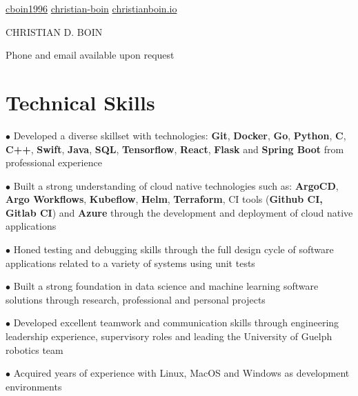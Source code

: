 \documentclass[a4paper,11pt]{article}
\newcommand{\name}{CHRISTIAN D. BOIN} %
\newcommand{\github}{cboin1996} %
\newcommand{\linkedin}{christian-boin-6b705a135} %
\begin{document}
\selectfont


\newcommand{\iconspace}{0.4mm}
\newcommand{\headingsep}{1cm}
\begin{center}
    \small{\href{https://github.com/\github}{\faGithub \hspace{\iconspace} \github} \hspace{\headingsep}
           \href{https://www.linkedin.com/in/\linkedin/}{\faLinkedinSquare \hspace{\iconspace} christian-boin} \hspace{\headingsep}
           \href{http://www.christianboin.io}{\faFileCodeO \hspace{\iconspace} christianboin.io}
    }
\end{center}
\begin{center}
    \vspace{-0.4cm}
    \huge{{\name}}
\end{center}
\begin{center}
    \vspace{-0.2cm}
    \tiny{
        Phone and email available upon request
    }
\end{center}
\section{Technical Skills}
\resumeItemListStart
\item[$\bullet$] Developed a diverse skillset with technologies: \textbf{Git}, \textbf{Docker}, \textbf{Go},
\textbf{Python}, \textbf{C}, \textbf{C++}, \textbf{Swift}, \textbf{Java}, \textbf{SQL}, \textbf{Tensorflow}, \textbf{React},
\textbf{Flask} and \textbf{Spring Boot} from professional experience
\item[$\bullet$] Built a strong understanding of cloud native technologies such as: \textbf{ArgoCD}, \textbf{Argo Workflows},
\textbf{Kubeflow}, \textbf{Helm},
\textbf{Terraform}, CI tools (\textbf{Github CI, Gitlab CI}) and \textbf{Azure} through the development and deployment
of cloud native applications
\item[$\bullet$] Honed testing and debugging skills through the full design cycle of software applications related
to a variety of systems using unit tests
\item[$\bullet$] Built a strong foundation in data science and machine learning software solutions through
research, professional and personal projects
\item[$\bullet$] Developed excellent teamwork and communication skills through engineering leadership experience,
supervisory roles and leading the University of Guelph robotics team
\item[$\bullet$] Acquired years of experience with Linux, MacOS and Windows as development environments
\resumeItemListEnd
\end{document}
